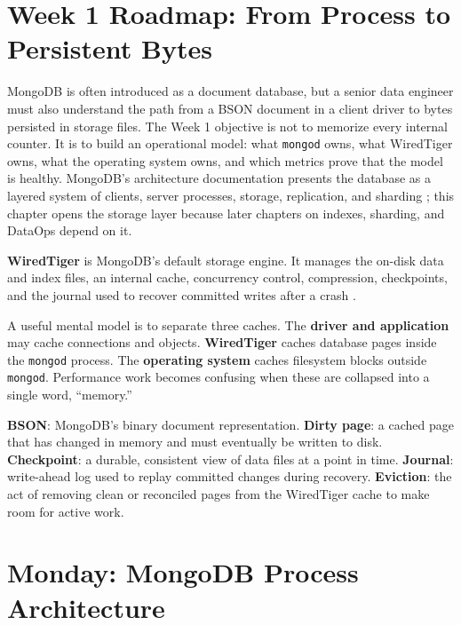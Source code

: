 \section{Week 1 Roadmap: From Process to Persistent Bytes}
MongoDB is often introduced as a document database, but a senior data engineer must also understand the path from a BSON document in a client driver to bytes persisted in storage files. The Week 1 objective is not to memorize every internal counter. It is to build an operational model: what \texttt{mongod} owns, what WiredTiger owns, what the operating system owns, and which metrics prove that the model is healthy. MongoDB's architecture documentation presents the database as a layered system of clients, server processes, storage, replication, and sharding \cite{mongodbArchitectureDocs}; this chapter opens the storage layer because later chapters on indexes, sharding, and DataOps depend on it.

\begin{definitionbox}
\textbf{WiredTiger} is MongoDB's default storage engine. It manages the on-disk data and index files, an internal cache, concurrency control, compression, checkpoints, and the journal used to recover committed writes after a crash \cite{mongodbWiredTigerDocs,wiredTigerArch}.
\end{definitionbox}

A useful mental model is to separate three caches. The \textbf{driver and application} may cache connections and objects. \textbf{WiredTiger} caches database pages inside the \texttt{mongod} process. The \textbf{operating system} caches filesystem blocks outside \texttt{mongod}. Performance work becomes confusing when these are collapsed into a single word, ``memory.''

\begin{keyterms}
\textbf{BSON}: MongoDB's binary document representation. \textbf{Dirty page}: a cached page that has changed in memory and must eventually be written to disk. \textbf{Checkpoint}: a durable, consistent view of data files at a point in time. \textbf{Journal}: write-ahead log used to replay committed changes during recovery. \textbf{Eviction}: the act of removing clean or reconciled pages from the WiredTiger cache to make room for active work.
\end{keyterms}

\section{Monday: MongoDB Process Architecture}
